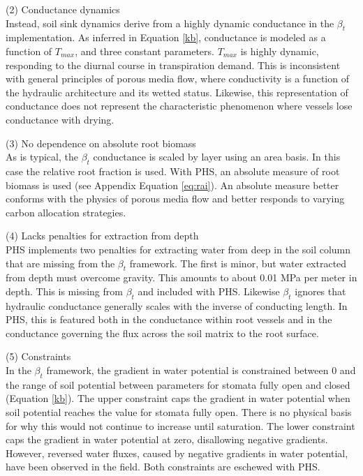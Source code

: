 \documentclass[draft,linenumbers]{agujournal}
\begin{document}
    (2) Conductance dynamics \\
    Instead, soil sink dynamics derive from a highly dynamic conductance in the $\beta_t$ implementation.
    As inferred in Equation \ref{kb}, conductance is modeled as a function of $T_{max}$, and three constant parameters.
    $T_{max}$ is highly dynamic, responding to the diurnal course in transpiration demand.
    This is inconsistent with general principles of porous media flow, where conductivity is a function of the hydraulic architecture and its wetted status.
    Likewise, this representation of conductance does not represent the characteristic phenomenon where vessels lose conductance with drying.
      
    (3) No dependence on absolute root biomass \\
    As is typical, the $\beta_t$ conductance is scaled by layer using an area basis.
    In this case the relative root fraction is used.
    With PHS, an absolute measure of root biomass is used (see Appendix Equation \ref{eq:rai}).
    An absolute measure better conforms with the physics of porous media flow and better responds to varying carbon allocation strategies.

    (4) Lacks penalties for extraction from depth \\
    PHS implements two penalties for extracting water from deep in the soil column that are missing from the $\beta_t$ framework.
    The first is minor, but water extracted from depth must overcome gravity. This amounts to about 0.01 MPa per meter in depth. 
    This is missing from $\beta_t$ and included with PHS. 
    Likewise $\beta_t$ ignores that hydraulic conductance generally scales with the inverse of conducting length.
    In PHS, this is featured both in the conductance within root vessels and 
    in the conductance governing the flux across the soil matrix to the root surface.
    
    (5) Constraints \\
    In the $\beta_t$ framework, the gradient in water potential is constrained between 0 and 
    the range of soil potential between parameters for stomata fully open and closed (Equation \ref{kb}). 
    The upper constraint caps the gradient in water potential when soil potential reaches the value for stomata fully open.
    There is no physical basis for why this would not continue to increase until saturation.
    The lower constraint caps the gradient in water potential at zero, disallowing negative gradients.
    However, reversed water fluxes, caused by negative gradients in water potential, have been observed in the field.
    Both constraints are eschewed with PHS.
    
\end{document}
